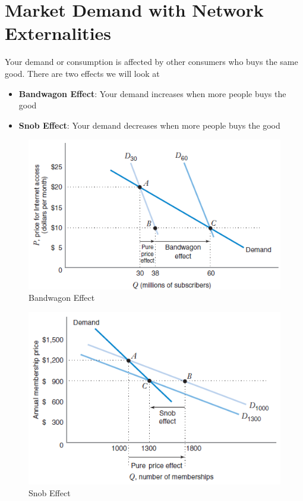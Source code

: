 \documentclass[../ECON-281-Notes.tex]{subfiles}
\begin{document}
\section{Market Demand with Network Externalities}
Your demand or consumption is affected by other consumers who buys the same good. 
There are two effects we will look at
\begin{itemize}
    \item \textbf{Bandwagon Effect}: Your demand increases when more people buys the good
    \item \textbf{Snob Effect}: Your demand decreases when more people buys the good
\end{itemize}
\newpage
\begin{figure}[!ht]
    \centering
    \includegraphics[width=\columnwidth]{../assets/bandwagon.png}
    \caption{Bandwagon Effect}
    \label{fig:bandwagon_effect}
\end{figure}

\begin{figure}[!ht]
    \centering
    \includegraphics[width=\columnwidth]{../assets/snob.png}
    \caption{Snob Effect}
    \label{fig:snob_effect}
\end{figure}
\end{document}
